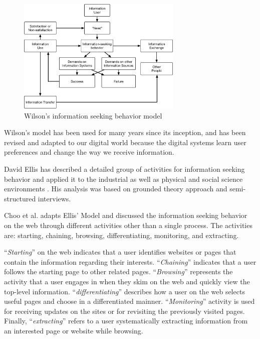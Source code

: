 \begin{figure}
    \centering
    \includegraphics[width=0.7\textwidth]{figures/wilson-info-behavior}
    \caption{Wilson's information seeking behavior model \cite{wilson1981user}}
    \label{fig:wilson-info-seek}
\end{figure}

Wilson's model has been used for many years since its inception, and has been revised 
and adapted to our digital world because the digital systems learn user preferences and 
change \cite{giannini1998receiving} the way we receive information.

David Ellis has described a detailed group of activities for information seeking behavior \cite{ellis1989behavioural}
and applied it to the industrial as well as physical and social science \cite{ellis1993comparison} 
environments \cite{ellis1997modelling}.
His analysis was based on grounded theory approach \cite{aceto1994grounded} and semi-structured interviews. 

Choo et al. adapts Ellis' Model and discussed \cite{choo1999information}
the information seeking behavior on the web through different activities other than 
a single process. The activities are:
starting, chaining, browsing, differentiating, monitoring, and extracting.

``\emph{Starting}'' on the web indicates that a user identifies websites or pages
that contain the information regarding their interests.
``\emph{Chaining}'' indicates that a user follows the starting page to other related pages.
``\emph{Browsing}'' represents the activity that a user engages in when they skim on the web
and quickly view the top-level information. 
``\emph{differentiating}'' describes how a user on the web selects useful pages 
and choose in a differentiated mainner.
``\emph{Monitoring}'' activity is used for receiving updates on the sites or for revisiting
the previously visited pages. Finally, ``\emph{extracting}'' refers to a user
systematically extracting information from an interested page or website while browsing.

